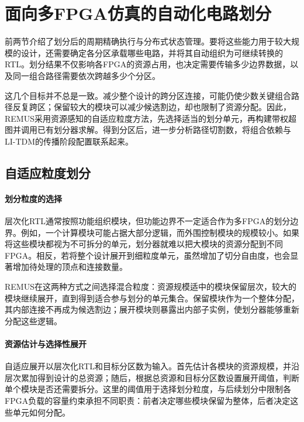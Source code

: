 \section{面向多FPGA仿真的自动化电路划分}
\label{sec:midterm-partitioning}

前两节介绍了划分后的周期精确执行与分布式状态管理。要将这些能力用于较大规模的设计，还需要确定各分区承载哪些电路，并将其自动组织为可继续转换的RTL。划分结果不仅影响各FPGA的资源占用，也决定需要传输多少边界数据，以及同一组合路径需要依次跨越多少个分区。

这几个目标并不总是一致。减少整个设计的跨分区连接，可能仍使少数关键组合路径反复跨区；保留较大的模块可以减少候选割边，却也限制了资源分配。因此，REMUS采用资源感知的自适应粒度方法，先选择适当的划分单元，再构建带权超图并调用已有划分器求解。得到分区后，进一步分析路径切割数，将组合依赖与LI-TDM的传播阶段配置联系起来。

\subsection{自适应粒度划分}
\label{sec:midterm-adaptive-partitioning}

\paragraph{划分粒度的选择}

层次化RTL通常按照功能组织模块，但功能边界不一定适合作为多FPGA的划分边界。例如，一个计算模块可能占据大部分逻辑，而外围控制模块的规模较小。如果将这些模块都视为不可拆分的单元，划分器就难以把大模块的资源分配到不同FPGA。相反，若将整个设计展开到细粒度单元，虽然增加了切分自由度，也会显著增加待处理的顶点和连接数量。

REMUS在这两种方式之间选择混合粒度：资源规模适中的模块保留层次，较大的模块继续展开，直到得到适合参与划分的单元集合。保留模块作为一个整体分配，其内部连接不再成为候选割边；展开模块则暴露出内部子实例，使划分器能够重新分配这些逻辑。

\paragraph{资源估计与选择性展开}

自适应展开以层次化RTL和目标分区数为输入。首先估计各模块的资源规模，并沿层次累加得到设计的总资源；随后，根据总资源和目标分区数设置展开阈值，判断单个模块是否还需要拆分。这里的阈值用于选择划分粒度，与后续划分中限制各FPGA负载的容量约束承担不同职责：前者决定哪些模块保留为整体，后者决定这些单元如何分配。

